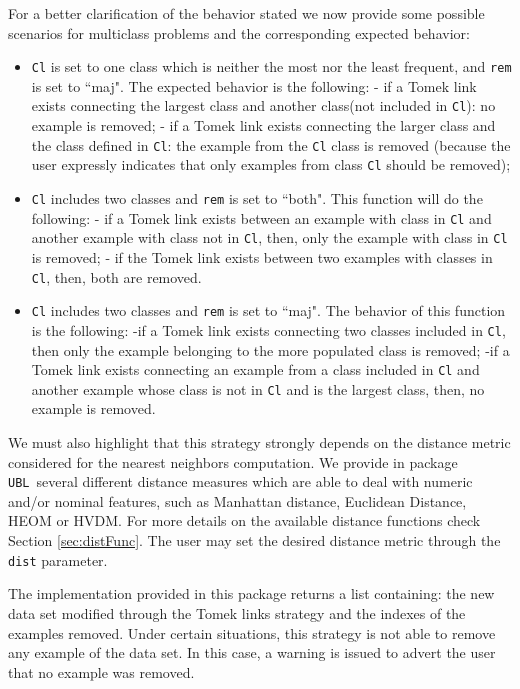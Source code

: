 \documentclass[10pt,a4paper]{article}\usepackage[]{graphicx}\usepackage[]{color}
\newcommand{\pUBL}{package \texttt{UBL}\ }
\begin{document}
For a better clarification of the behavior stated we now provide some possible scenarios for multiclass problems and the corresponding expected behavior:

\begin{itemize}
\item \texttt{Cl} is set to one class which is neither the most nor the least frequent, and \texttt{rem} is set to ``maj". The expected behavior is the following:
- if a Tomek link exists connecting the largest class and another class(not included in \texttt{Cl}): no example is removed;
- if a Tomek link exists connecting the larger class and the class defined in \texttt{Cl}: the example from the \texttt{Cl} class is removed (because the user expressly indicates that only examples from class \texttt{Cl} should be removed);

\item \texttt{Cl} includes two classes and \texttt{rem} is set to ``both". This function will do the following:
- if a Tomek link exists between an example with class in \texttt{Cl} and another example with class not in \texttt{Cl}, then, only the example with class in \texttt{Cl} is removed;
- if the Tomek link exists between two examples with classes in \texttt{Cl}, then, both are removed.

\item \texttt{Cl} includes two classes and \texttt{rem} is set to ``maj". The behavior of this function is the following:
-if a Tomek link exists connecting two classes included in \texttt{Cl}, then only the example belonging to the more populated class is removed;
-if a Tomek link exists connecting an example from a class included in \texttt{Cl} and another example whose class is not in \texttt{Cl} and is the largest class, then, no example is removed.

\end{itemize}


We must also highlight that this strategy strongly depends on the distance metric considered for the nearest neighbors computation. We provide in \pUBL several different distance measures which are able to deal with numeric and/or nominal features, such as Manhattan distance, Euclidean Distance, HEOM or HVDM. For more details on the available distance functions check Section \ref{sec:distFunc}. The user may set the desired distance metric through the \texttt{dist} parameter.


The implementation provided in this package returns a list containing: the new data set modified through the Tomek links strategy and the indexes of the examples removed. Under certain situations, this strategy is not able to remove any example of the data set. In this case, a warning is issued to advert the user that no example was removed.
\end{document}
